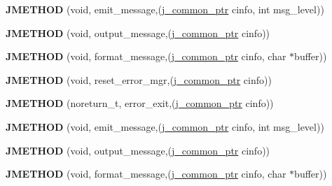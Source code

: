 \begin{DoxyCompactItemize}
\mbox{\label{structjpeg__error__mgr_a73c0a027b6e6cb8ff2b7b0fc42f756f9}} 
{\bfseries J\+M\+E\+T\+H\+OD} (void, emit\+\_\+message,(\hyperlink{structjpeg__common__struct}{j\+\_\+common\+\_\+ptr} cinfo, int msg\+\_\+level))
\item 
\mbox{\label{structjpeg__error__mgr_ac2989f8ef34acdd78ce26a9110a1c094}} 
{\bfseries J\+M\+E\+T\+H\+OD} (void, output\+\_\+message,(\hyperlink{structjpeg__common__struct}{j\+\_\+common\+\_\+ptr} cinfo))
\item 
\mbox{\label{structjpeg__error__mgr_a5f1dfb51c337c36ae1bc5fae7f84528f}} 
{\bfseries J\+M\+E\+T\+H\+OD} (void, format\+\_\+message,(\hyperlink{structjpeg__common__struct}{j\+\_\+common\+\_\+ptr} cinfo, char $\ast$buffer))
\item 
\mbox{\label{structjpeg__error__mgr_ac676478083167b3731995d7901bd4b6c}} 
{\bfseries J\+M\+E\+T\+H\+OD} (void, reset\+\_\+error\+\_\+mgr,(\hyperlink{structjpeg__common__struct}{j\+\_\+common\+\_\+ptr} cinfo))
\item 
\mbox{\label{structjpeg__error__mgr_a72c40bceda2e6cb78046165e6892ac3a}} 
{\bfseries J\+M\+E\+T\+H\+OD} (noreturn\+\_\+t, error\+\_\+exit,(\hyperlink{structjpeg__common__struct}{j\+\_\+common\+\_\+ptr} cinfo))
\item 
\mbox{\label{structjpeg__error__mgr_a73c0a027b6e6cb8ff2b7b0fc42f756f9}} 
{\bfseries J\+M\+E\+T\+H\+OD} (void, emit\+\_\+message,(\hyperlink{structjpeg__common__struct}{j\+\_\+common\+\_\+ptr} cinfo, int msg\+\_\+level))
\item 
\mbox{\label{structjpeg__error__mgr_ac2989f8ef34acdd78ce26a9110a1c094}} 
{\bfseries J\+M\+E\+T\+H\+OD} (void, output\+\_\+message,(\hyperlink{structjpeg__common__struct}{j\+\_\+common\+\_\+ptr} cinfo))
\item 
\mbox{\label{structjpeg__error__mgr_a5f1dfb51c337c36ae1bc5fae7f84528f}} 
{\bfseries J\+M\+E\+T\+H\+OD} (void, format\+\_\+message,(\hyperlink{structjpeg__common__struct}{j\+\_\+common\+\_\+ptr} cinfo, char $\ast$buffer))
\item 

\end{DoxyCompactItemize}
